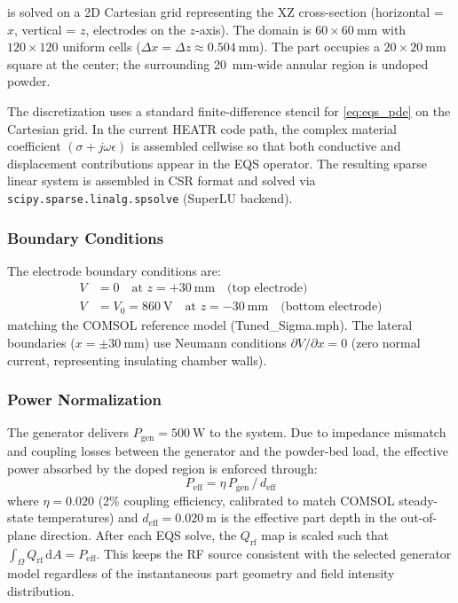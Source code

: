 \documentclass[5p,times]{elsarticle}
\newcommand{\Qrf}{Q_{\mathrm{rf}}}
\begin{document}
 is solved on a 2D Cartesian grid representing the
XZ cross-section (horizontal = $x$, vertical = $z$, electrodes on the
$z$-axis).  The domain is $60 \times \SI{60}{\milli\meter}$ with
$120 \times 120$ uniform cells ($\Delta x = \Delta z \approx
\SI{0.504}{\milli\meter}$).  The part occupies a $20 \times
\SI{20}{\milli\meter}$ square at the center; the surrounding
\SI{20}{\milli\meter}-wide annular region is undoped powder.

The discretization uses a standard finite-difference stencil for
\cref{eq:eqs_pde} on the Cartesian grid.  In the current HEATR code
path, the complex material coefficient $(\sigma + j\omega\epsilon)$ is
assembled cellwise so that both conductive and displacement
contributions appear in the EQS operator.  The resulting sparse linear
system is assembled in CSR format and solved via
\texttt{scipy.sparse.linalg.spsolve} (SuperLU backend).

\subsubsection{Boundary Conditions}

The electrode boundary conditions are:
\begin{align}
  V &= 0 \quad \text{at } z = +\SI{30}{\milli\meter} \quad
       \text{(top electrode)} \label{eq:bc_top}\\
  V &= V_0 = \SI{860}{\volt} \quad \text{at } z = -\SI{30}{\milli\meter}
       \quad \text{(bottom electrode)} \label{eq:bc_bot}
\end{align}
matching the COMSOL reference model (Tuned\_Sigma.mph).  The lateral
boundaries ($x = \pm\SI{30}{\milli\meter}$) use Neumann conditions
$\partial V/\partial x = 0$ (zero normal current, representing
insulating chamber walls).

\subsubsection{Power Normalization}

The generator delivers $P_{\mathrm{gen}} = \SI{500}{\watt}$ to the
system.  Due to impedance mismatch and coupling losses between the
generator and the powder-bed load, the effective power absorbed by the
doped region is enforced through:
\begin{equation}
  P_{\mathrm{eff}} = \eta\,P_{\mathrm{gen}}\,/\,d_{\mathrm{eff}}
  \label{eq:power_eff}
\end{equation}
where $\eta = 0.020$ (2\% coupling efficiency, calibrated to match
COMSOL steady-state temperatures) and $d_{\mathrm{eff}} =
\SI{0.020}{\meter}$ is the effective part depth in the out-of-plane
direction.  After each EQS solve, the $\Qrf$ map is scaled such that
$\int_\Omega \Qrf\,\mathrm{d}A = P_{\mathrm{eff}}$.  This keeps the
RF source consistent with the selected generator model regardless of
the instantaneous part geometry and field intensity distribution.
\end{document}

